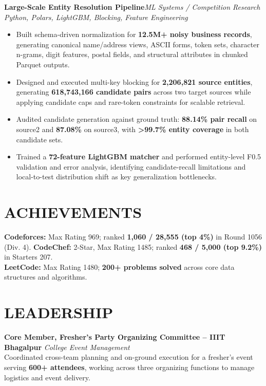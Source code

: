 \documentclass[letterpaper,11pt]{article}
\newcommand{\resumeItem}[1]{\item \small\justifying #1}
\newcommand{\resumeItemListStart}{%
  \begin{itemize}[
    leftmargin=0.20in,
    label=\raisebox{0.20ex}{\tiny$\bullet$},
    itemsep=2.5pt,
    topsep=3pt,
    parsep=0pt,
    partopsep=0pt
  ]
}
\newcommand{\resumeItemListEnd}{\end{itemize}\vspace{-1pt}}
\newcommand{\projectHeading}[3]{%
  \par\noindent\textbf{\large #1}\hfill\textit{\small #2}\\[-1pt]
  {\small\color{Muted}\textit{#3}}\par\vspace{2pt}
}
\begin{document}
\projectHeading
  {Large-Scale Entity Resolution Pipeline\hspace{5pt}\href{https://github.com/Vineet-2028/Entity}{\raisebox{0.15ex}{\footnotesize\faGithub}}}
  {ML Systems / Competition Research}
  {Python, Polars, LightGBM, Blocking, Feature Engineering}
\resumeItemListStart
  \resumeItem{Built schema-driven normalization for \textbf{12.5M+ noisy business records}, generating canonical name/address views, ASCII forms, token sets, character n-grams, digit features, postal fields, and structural attributes in chunked Parquet outputs.}
  \resumeItem{Designed and executed multi-key blocking for \textbf{2,206,821 source entities}, generating \textbf{618,743,166 candidate pairs} across two target sources while applying candidate caps and rare-token constraints for scalable retrieval.}
  \resumeItem{Audited candidate generation against ground truth: \textbf{88.14\% pair recall} on source2 and \textbf{87.08\%} on source3, with \textbf{>99.7\% entity coverage} in both candidate sets.}
  \resumeItem{Trained a \textbf{72-feature LightGBM matcher} and performed entity-level F0.5 validation and error analysis, identifying candidate-recall limitations and local-to-test distribution shift as key generalization bottlenecks.}
\resumeItemListEnd

\section{ACHIEVEMENTS}
\small\justifying
\textbf{Codeforces:} Max Rating 969; ranked \textbf{1,060 / 28,555 (top 4\%)} in Round 1056 (Div. 4). \quad
\textbf{CodeChef:} 2-Star, Max Rating 1485; ranked \textbf{468 / 5,000 (top 9.2\%)} in Starters 207.\\[2pt]
\textbf{LeetCode:} Max Rating 1480; \textbf{200+ problems solved} across core data structures and algorithms.
\vspace{-2pt}

\section{LEADERSHIP}
\small\justifying
\textbf{Core Member, Fresher's Party Organizing Committee -- IIIT Bhagalpur} \hfill \textit{College Event Management}\\[2pt]
Coordinated cross-team planning and on-ground execution for a fresher's event serving \textbf{600+ attendees}, working across three organizing functions to manage logistics and event delivery.
\end{document}
